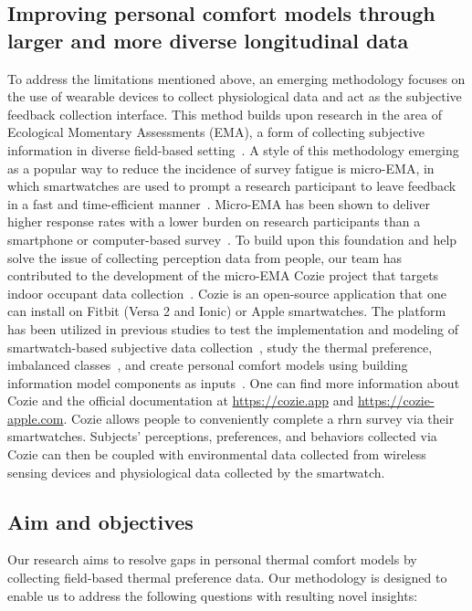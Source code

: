 \subsection{Improving personal comfort models through larger and more diverse longitudinal data}\label{subsec:our_approach}
To address the limitations mentioned above, an emerging methodology focuses on the use of wearable devices to collect physiological data and act as the subjective feedback collection interface. 
This method builds upon research in the area of Ecological Momentary Assessments (EMA), a form of collecting subjective information in diverse field-based setting~\cite{Shiffman2008-xb}. 
A style of this methodology emerging as a popular way to reduce the incidence of survey fatigue is micro-EMA, in which smartwatches are used to prompt a research participant to leave feedback in a fast and time-efficient manner~\cite{Intille2016-xb}.
Micro-EMA has been shown to deliver higher response rates with a lower burden on research participants than a smartphone or computer-based survey~\cite{Ponnada2017-dl}.
To build upon this foundation and help solve the issue of collecting perception data from people, our team has contributed to the development of the micro-EMA Cozie project that targets indoor occupant data collection~\cite{Jayathissa2019a}.
Cozie is an open-source application that one can install on Fitbit (Versa 2 and Ionic) or Apple smartwatches.
The platform has been utilized in previous studies to test the implementation and modeling of smartwatch-based subjective data collection~\cite{Jayathissa2020-pv, Quintana2021-ka}, study the thermal preference, imbalanced classes~\cite{Quintana2020-zu}, and create personal comfort models using building information model components as inputs~\cite{Abdelrahman2021-mx}.
One can find more information about Cozie and the official documentation at \url{https://cozie.app} and \url{https://cozie-apple.com}.
Cozie allows people to conveniently complete a \ac{rhrn} survey via their smartwatches.
Subjects' perceptions, preferences, and behaviors collected via Cozie can then be coupled with environmental data collected from wireless sensing devices and physiological data collected by the smartwatch.

\subsection{Aim and objectives}\label{subsec:aim_objectives}
Our research aims to resolve gaps in personal thermal comfort models by collecting field-based thermal preference data.
Our methodology is designed to enable us to address the following questions with resulting novel insights:

